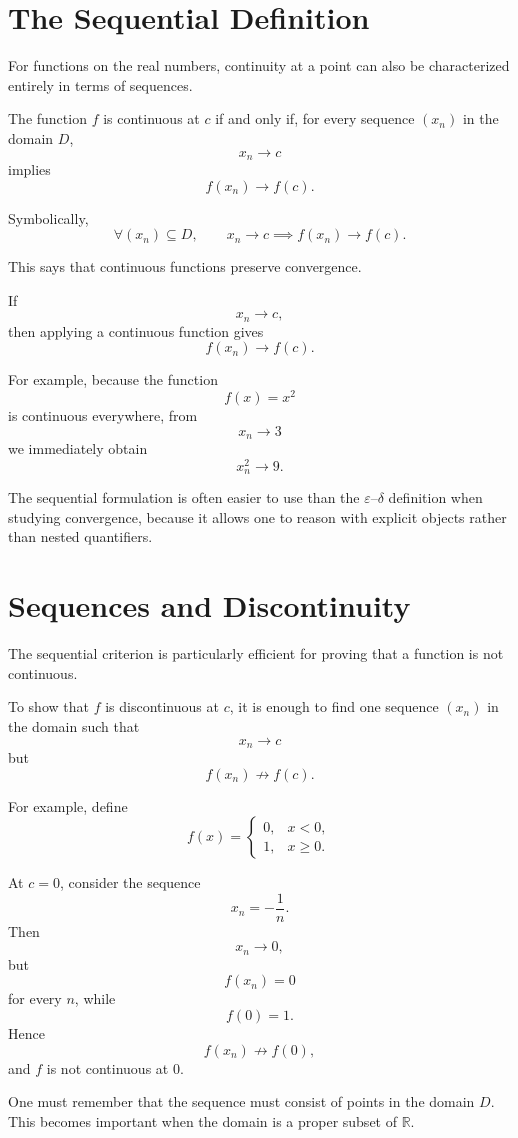\documentclass{essay}
\begin{document}
\section{The Sequential Definition}

For functions on the real numbers, continuity at a point can also be characterized entirely in terms of sequences.

The function \(f\) is continuous at \(c\) if and only if, for every sequence \((x_{n})\) in the domain \(D\),
\[ x_{n}\to c \]
implies
\[ f(x_{n})\to f(c). \]

Symbolically,
\[ \boxed{ \forall (x_{n})\subseteq D, \qquad x_{n}\to c \implies f(x_{n})\to f(c). } \]

This says that continuous functions preserve convergence.

If
\[ x_{n}\to c, \]
then applying a continuous function gives
\[ f(x_{n})\to f(c). \]

For example, because the function
\[ f(x)=x^{2} \]
is continuous everywhere, from
\[ x_{n}\to 3 \]
we immediately obtain
\[ x_{n}^{2}\to 9. \]

The sequential formulation is often easier to use than the \(\varepsilon\)--\(\delta\) definition when studying convergence, because it allows one to reason with explicit objects rather than nested quantifiers.

\section{Sequences and Discontinuity}

The sequential criterion is particularly efficient for proving that a function is not continuous.

To show that \(f\) is discontinuous at \(c\), it is enough to find one sequence \((x_{n})\) in the domain such that
\[ x_{n}\to c \]
but
\[ f(x_{n})\not\to f(c). \]

For example, define
\[
  f(x)=
  \begin{cases}
    0, & x<0,\\
    1, & x\ge 0.
  \end{cases}
\]

At \(c=0\), consider the sequence
\[ x_{n}=-\frac{1}{n}. \]
Then
\[ x_{n}\to 0, \]
but
\[ f(x_{n})=0 \]
for every \(n\), while
\[ f(0)=1. \]
Hence
\[ f(x_{n})\not\to f(0), \]
and \(f\) is not continuous at \(0\).

One must remember that the sequence must consist of points in the domain \(D\). This becomes important when the domain is a proper subset of \(\mathbb{R}\).
\end{document}
